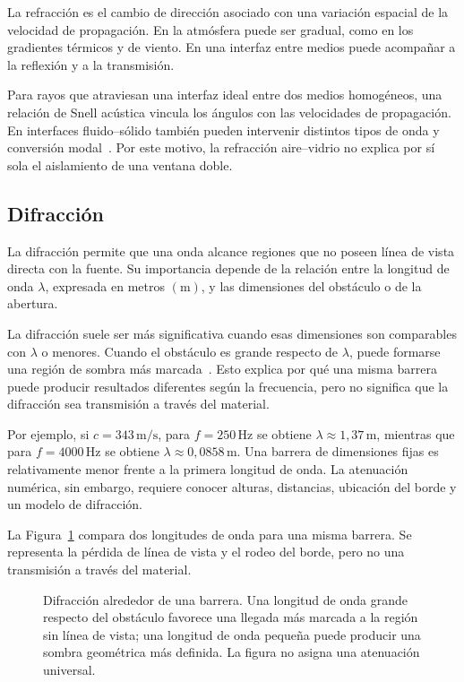 La refracción es el cambio de dirección asociado con una variación espacial de
la velocidad de propagación. En la atmósfera puede ser gradual, como en los
gradientes térmicos y de viento. En una interfaz entre medios puede acompañar
a la reflexión y a la transmisión.

Para rayos que atraviesan una interfaz ideal entre dos medios
homogéneos, una relación de Snell acústica vincula los ángulos con las
velocidades de propagación. En interfaces fluido--sólido también pueden
intervenir distintos tipos de onda y conversión modal~\cite{xiangBlauert2021}. Por este motivo, la
refracción aire--vidrio no explica por sí sola el aislamiento de una ventana
doble.

\subsection{Difracción}
\label{sec:u9-difraccion}

La difracción permite que una onda alcance regiones que no poseen línea de
vista directa con la fuente. Su importancia depende de la relación entre la
longitud de onda \(\lambda\), expresada en metros \((\text{m})\), y las
dimensiones del obstáculo o de la abertura.

La difracción suele ser más significativa cuando esas dimensiones son
comparables con \(\lambda\) o menores. Cuando el obstáculo es grande respecto
de \(\lambda\), puede formarse una región de sombra más marcada~\cite{xiangBlauert2021}. Esto explica
por qué una misma barrera puede producir resultados diferentes según la
frecuencia, pero no significa que la difracción sea transmisión a través del
material.

Por ejemplo, si \(c=343\,\text{m}/\text{s}\), para \(f=250\,\text{Hz}\) se
obtiene \(\lambda\approx1{,}37\,\text{m}\), mientras que para
\(f=4000\,\text{Hz}\) se obtiene \(\lambda\approx0{,}0858\,\text{m}\). Una
barrera de dimensiones fijas es relativamente menor frente a la primera
longitud de onda. La atenuación numérica, sin embargo, requiere conocer
alturas, distancias, ubicación del borde y un modelo de difracción.

La Figura~\ref{fig:u9-difraccion-barrera} compara dos longitudes de onda para
una misma barrera. Se representa la pérdida de línea de vista y el rodeo del
borde, pero no una transmisión a través del material.

\begin{figure}[htbp]
    \centering
    
    \caption{Difracción alrededor de una barrera. Una longitud de onda grande
    respecto del obstáculo favorece una llegada más marcada a la región sin
    línea de vista; una longitud de onda pequeña puede producir una sombra
    geométrica más definida. La figura no asigna una atenuación universal.}
    \label{fig:u9-difraccion-barrera}
\end{figure}

